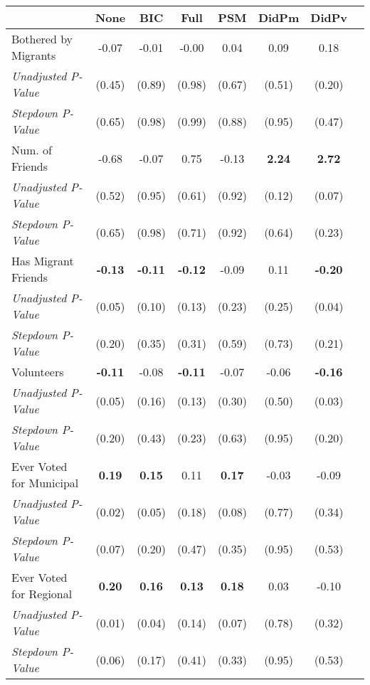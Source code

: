 \begin{tabular}{l c c c c c c c}
\toprule
 & None & BIC & Full & PSM & DidPm & DidPv \\
\midrule
Bothered by Migrants & -0.07 & -0.01 & -0.00 & 0.04 & 0.09 & 0.18 \\
\quad \textit{Unadjusted P-Value} & (0.45) & (0.89) & (0.98) & (0.67) & (0.51) & (0.20) \\
\quad \textit{Stepdown P-Value} & (0.65) & (0.98) & (0.99) & (0.88) & (0.95) & (0.47) \\
Num. of Friends & -0.68 & -0.07 & 0.75 & -0.13 & \textbf{ 2.24 } & \textbf{ 2.72 } \\
\quad \textit{Unadjusted P-Value} & (0.52) & (0.95) & (0.61) & (0.92) & (0.12) & (0.07) \\
\quad \textit{Stepdown P-Value} & (0.65) & (0.98) & (0.71) & (0.92) & (0.64) & (0.23) \\
Has Migrant Friends & \textbf{ -0.13 } & \textbf{ -0.11 } & \textbf{ -0.12 } & -0.09 & 0.11 & \textbf{ -0.20 } \\
\quad \textit{Unadjusted P-Value} & (0.05) & (0.10) & (0.13) & (0.23) & (0.25) & (0.04) \\
\quad \textit{Stepdown P-Value} & (0.20) & (0.35) & (0.31) & (0.59) & (0.73) & (0.21) \\
Volunteers & \textbf{ -0.11 } & -0.08 & \textbf{ -0.11 } & -0.07 & -0.06 & \textbf{ -0.16 } \\
\quad \textit{Unadjusted P-Value} & (0.05) & (0.16) & (0.13) & (0.30) & (0.50) & (0.03) \\
\quad \textit{Stepdown P-Value} & (0.20) & (0.43) & (0.23) & (0.63) & (0.95) & (0.20) \\
Ever Voted for Municipal & \textbf{ 0.19 } & \textbf{ 0.15 } & 0.11 & \textbf{ 0.17 } & -0.03 & -0.09 \\
\quad \textit{Unadjusted P-Value} & (0.02) & (0.05) & (0.18) & (0.08) & (0.77) & (0.34) \\
\quad \textit{Stepdown P-Value} & (0.07) & (0.20) & (0.47) & (0.35) & (0.95) & (0.53) \\
Ever Voted for Regional & \textbf{ 0.20 } & \textbf{ 0.16 } & \textbf{ 0.13 } & \textbf{ 0.18 } & 0.03 & -0.10 \\
\quad \textit{Unadjusted P-Value} & (0.01) & (0.04) & (0.14) & (0.07) & (0.78) & (0.32) \\
\quad \textit{Stepdown P-Value} & (0.06) & (0.17) & (0.41) & (0.33) & (0.95) & (0.53) \\
\bottomrule
\end{tabular}
